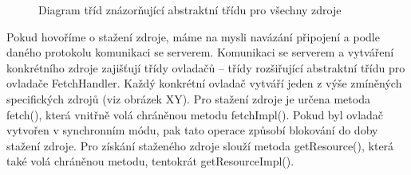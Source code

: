 \begin{figure}[H]
  \begin{center}
    \caption{Diagram tříd znázorňující abstraktní třídu pro všechny zdroje}
    \label{Figure.Resource}
  \end{center}
\end{figure}

Pokud hovoříme o stažení zdroje, máme na mysli navázání připojení a podle daného protokolu komunikaci se serverem. Komunikaci se serverem a vytváření konkrétního zdroje zajišťují třídy ovladačů – třídy rozšiřující abstraktní třídu pro ovladače FetchHandler. Každý konkrétní ovladač vytváří jeden z výše zmíněných specifických zdrojů (viz obrázek XY). Pro stažení zdroje je určena metoda fetch(), která vnitřně volá chráněnou metodu fetchImpl(). Pokud byl ovladač vytvořen v synchronním módu, pak tato operace způsobí blokování do doby stažení zdroje. Pro získání staženého zdroje slouží metoda getResource(), která také volá chráněnou metodu, tentokrát getResourceImpl(). 

